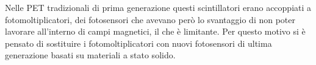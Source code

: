 Nelle PET tradizionali di prima generazione questi scintillatori erano accoppiati a fotomoltiplicatori, dei fotosensori che avevano però lo svantaggio di non poter lavorare all'interno di campi magnetici, il che è limitante. Per questo motivo si è pensato di sostituire i fotomoltiplicatori con nuovi fotosensori di ultima generazione basati su materiali a stato solido.